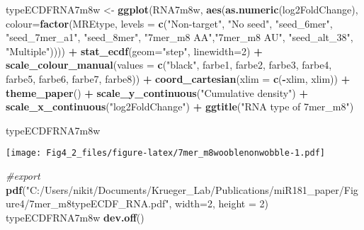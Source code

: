 \documentclass[
]{article}
\newenvironment{Shaded}{\begin{snugshade}}{\end{snugshade}}
\newcommand{\AttributeTok}[1]{\textcolor[rgb]{0.13,0.29,0.53}{#1}}
\newcommand{\CommentTok}[1]{\textcolor[rgb]{0.56,0.35,0.01}{\textit{#1}}}
\newcommand{\DecValTok}[1]{\textcolor[rgb]{0.00,0.00,0.81}{#1}}
\newcommand{\FunctionTok}[1]{\textcolor[rgb]{0.13,0.29,0.53}{\textbf{#1}}}
\newcommand{\NormalTok}[1]{#1}
\newcommand{\OtherTok}[1]{\textcolor[rgb]{0.56,0.35,0.01}{#1}}
\newcommand{\SpecialCharTok}[1]{\textcolor[rgb]{0.81,0.36,0.00}{\textbf{#1}}}
\newcommand{\StringTok}[1]{\textcolor[rgb]{0.31,0.60,0.02}{#1}}
\begin{document}
\begin{Shaded}
\begin{Highlighting}[]
\NormalTok{typeECDFRNA7m8w }\OtherTok{\textless{}{-}} \FunctionTok{ggplot}\NormalTok{(RNA7m8w, }\FunctionTok{aes}\NormalTok{(}\FunctionTok{as.numeric}\NormalTok{(log2FoldChange), }
                              \AttributeTok{colour=}\FunctionTok{factor}\NormalTok{(MREtype, }\AttributeTok{levels =} \FunctionTok{c}\NormalTok{(}\StringTok{"Non{-}target"}\NormalTok{, }\StringTok{"No seed"}\NormalTok{, }\StringTok{"seed\_6mer"}\NormalTok{, }\StringTok{"seed\_7mer\_a1"}\NormalTok{, }\StringTok{"seed\_8mer"}\NormalTok{, }\StringTok{"7mer\_m8 AA"}\NormalTok{,}\StringTok{"7mer\_m8 AU"}\NormalTok{, }\StringTok{"seed\_alt\_38"}\NormalTok{, }\StringTok{"Multiple"}\NormalTok{)))) }\SpecialCharTok{+} 
  \FunctionTok{stat\_ecdf}\NormalTok{(}\AttributeTok{geom=}\StringTok{"step"}\NormalTok{, }\AttributeTok{linewidth=}\DecValTok{2}\NormalTok{) }\SpecialCharTok{+}
  \FunctionTok{scale\_colour\_manual}\NormalTok{(}\AttributeTok{values =} \FunctionTok{c}\NormalTok{(}\StringTok{"black"}\NormalTok{, farbe1, farbe2, farbe3, farbe4, farbe5, farbe6, farbe7, farbe8)) }\SpecialCharTok{+}
  \FunctionTok{coord\_cartesian}\NormalTok{(}\AttributeTok{xlim =} \FunctionTok{c}\NormalTok{(}\SpecialCharTok{{-}}\NormalTok{xlim, xlim)) }\SpecialCharTok{+} 
  \FunctionTok{theme\_paper}\NormalTok{() }\SpecialCharTok{+}
  \FunctionTok{scale\_y\_continuous}\NormalTok{(}\StringTok{"Cumulative density"}\NormalTok{) }\SpecialCharTok{+} \FunctionTok{scale\_x\_continuous}\NormalTok{(}\StringTok{"log2FoldChange"}\NormalTok{) }\SpecialCharTok{+}
  \FunctionTok{ggtitle}\NormalTok{(}\StringTok{"RNA type of 7mer\_m8"}\NormalTok{)}

\NormalTok{typeECDFRNA7m8w}
\end{Highlighting}
\end{Shaded}

\texttt{[image: Fig4\_2\_files/figure-latex/7mer\_m8wooblenonwobble-1.pdf]}

\begin{Shaded}
\begin{Highlighting}[]
\CommentTok{\#export}
\FunctionTok{pdf}\NormalTok{(}\StringTok{"C:/Users/nikit/Documents/Krueger\_Lab/Publications/miR181\_paper/Figure4/7mer\_m8typeECDF\_RNA.pdf"}\NormalTok{, }\AttributeTok{width=}\DecValTok{2}\NormalTok{, }\AttributeTok{height =} \DecValTok{2}\NormalTok{)}
\NormalTok{typeECDFRNA7m8w}
\FunctionTok{dev.off}\NormalTok{()}
\end{Highlighting}
\end{Shaded}
\end{document}
